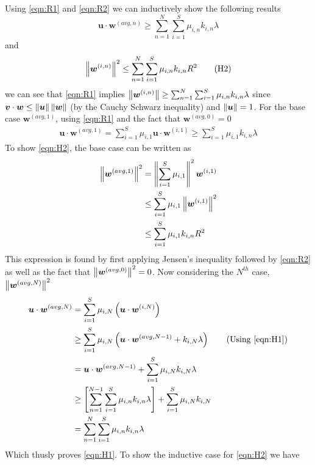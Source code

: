 Using \ref{eqn:R1} and \ref{eqn:R2} we can inductively show the following results
\begin{equation}
    \label{eqn:H1}
    \bm{u} \cdot \bm{w}^{(avg,n)} \geq \sum_{n=1}^{N} \sum_{i=1}^{S} \mu_{i,n} k_{i,n} \lambda \tag{H1}
\end{equation}
and
\begin{equation}
    \label{eqn:H2}
    \left\lVert\bm{w}^{(i,n)}\right\rVert^2 \leq \sum_{n=1}^{N} \sum_{i=1}^{S} \mu_{i,n} k_{i,n} R^2 \tag{H2}
\end{equation}
we can see that \ref{eqn:R1} implies $\left\lVert\bm{w}^{(i,n)}\right\rVert \geq \sum_{n=1}^{N} \sum_{i=1}^{S} \mu_{i,n} k_{i,n} \lambda$ since $\bm{v} \cdot \bm{w} \leq \left\lVert\bm{u}\right\rVert \left\lVert\bm{w}\right\rVert$ (by the Cauchy Schwarz inequality) and $\left\lVert\bm{u}\right\rVert = 1$. For the base case $\bm{w}^{(avg,1)}$, using \ref{eqn:R1} and the fact that $\bm{w}^{(avg,0)} = 0$ 
\begin{align*}
    \bm{u} \cdot \bm{w}^{(avg,1)} = \sum_{i=1}^{S} \mu_{i,1} \bm{u} \cdot \bm{w}^{(i,1)} \geq \sum_{i=1}^{S} \mu_{i,1}  k_{i,n} \lambda
\end{align*}
To show \ref{eqn:H2}, the base case can be written as
\begin{align*}
    \left\lVert\bm{w}^{(avg,1)}\right\rVert^2 &= \left\lVert\sum_{i=1}^{S} \mu_{i,1}\right\rVert^2 \bm{w}^{(i,1)} \\
    &\leq \sum_{i=1}^{S} \mu_{i,1} \left\lVert\bm{w}^{(i,1)}\right\rVert^{2} \\
    &\leq \sum_{i=1}^{S} \mu_{i,1} k_{i,n} R^2
\end{align*}
This expression is found by first applying Jensen's inequality followed by \ref{eqn:R2} as well as the fact that $\left\lVert\bm{w}^{(avg,0)}\right\rVert^2 = 0$. Now considering the $N^{th}$ case, $\left\lVert\bm{w}^{(avg,N)}\right\rVert^2$
\begingroup
\allowdisplaybreaks
\begin{align*}
    \bm{u} \cdot \bm{w}^{(avg,N)} &= \sum_{i=1}^{S} \mu_{i,N} \left( \bm{u} \cdot \bm{w}^{(i,N)} \right) \\
    &\geq \sum_{i=1}^{S} \mu_{i,N} \left( \bm{u} \cdot \bm{w}^{(avg,N-1)} + k_{i,N} \lambda \right) \tag{Using \ref{eqn:H1}} \\
    &= \bm{u} \cdot \bm{w}^{(avg,N-1)} + \sum_{i=1}^{S} \mu_{i,N} k_{i,N} \lambda \\
    &\geq \left[\sum_{n=1}^{N-1} \sum_{i=1}^{S} \mu_{i, n} k_{i, n} \lambda\right]+\sum_{i=1}^{S} \mu_{i, N} k_{i, N} \\
    &= \sum_{n=1}^{N} \sum_{i=1}^{S} \mu_{i, n} k_{i, n} \lambda
\end{align*}
\endgroup
Which thusly proves \ref{eqn:H1}. To show the inductive case for \ref{eqn:H2} we have
